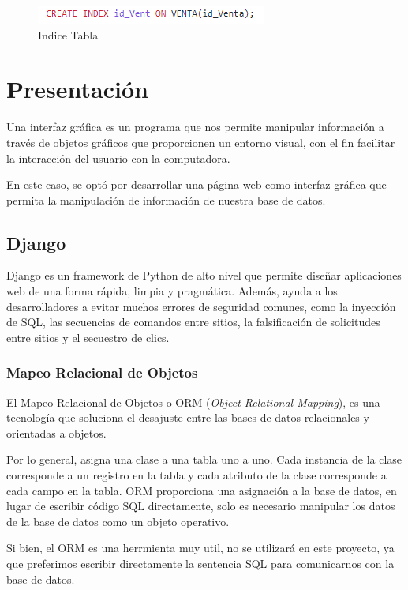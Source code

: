 \documentclass[12pt,letterpaper]{article}
\begin{document}
	\begin{figure}[H]
		\centering
		\includegraphics[scale=0.90]{Documentacion/img/indice.PNG}
		\caption{Indice Tabla}
	\end{figure}
	
	\section{Presentación}
	Una interfaz gráfica es un programa que nos permite manipular información a través de objetos gráficos que proporcionen un entorno visual, con el fin facilitar la interacción del usuario con la computadora.\par
	En este caso, se optó por desarrollar una página web como interfaz gráfica que permita la manipulación de información de nuestra base de datos.
	
	\subsection{Django}
	Django es un framework de Python de alto nivel que permite diseñar aplicaciones web de una forma rápida, limpia y pragmática. Además, ayuda a los desarrolladores a evitar muchos errores de seguridad comunes, como la inyección de SQL, las secuencias de comandos entre sitios, la falsificación de solicitudes entre sitios y el secuestro de clics.
	
	\subsubsection{Mapeo Relacional de Objetos}
	El Mapeo Relacional de Objetos o ORM (\textit{Object Relational Mapping}), es una tecnología que soluciona el desajuste entre las bases de datos relacionales y orientadas a objetos.\par 
	Por lo general, asigna una clase a una tabla uno a uno. Cada instancia de la clase corresponde a un registro en la tabla y cada atributo de la clase corresponde a cada campo en la tabla. ORM proporciona una asignación a la base de datos, en lugar de escribir código SQL directamente, solo es necesario manipular los datos de la base de datos como un objeto operativo.\par 
	Si bien, el ORM es una herrmienta muy util, no se utilizará en este proyecto, ya que preferimos escribir directamente la sentencia SQL para comunicarnos con la base de datos.
	
\end{document}
